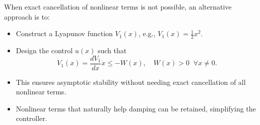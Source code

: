 \begin{remark}
When exact cancellation of nonlinear terms is not possible, an alternative approach is to:

\begin{itemize}
    \item Construct a Lyapunov function \(V_1(x)\), e.g., \(V_1(x) = \frac{1}{2} x^2\).  
    \item Design the control \(u(x)\) such that
    \[
    \dot{V}_1(x) = \frac{d V_1}{dx} \dot{x} \le - W(x), \quad W(x) > 0 \;\; \forall x \neq 0.
    \]  
    \item This ensures asymptotic stability without needing exact cancellation of all nonlinear terms.  
    \item Nonlinear terms that naturally help damping can be retained, simplifying the controller.
\end{itemize}
\end{remark}


